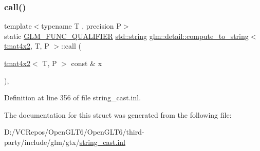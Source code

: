 \subsubsection{\texorpdfstring{call()}{call()}}
{\footnotesize\ttfamily template$<$typename T , precision P$>$ \\
static \mbox{\hyperlink{setup_8hpp_a33fdea6f91c5f834105f7415e2a64407}{G\+L\+M\+\_\+\+F\+U\+N\+C\+\_\+\+Q\+U\+A\+L\+I\+F\+I\+ER}} \mbox{\hyperlink{glad_8h_ac83513893df92266f79a515488701770}{std\+::string}} \mbox{\hyperlink{structglm_1_1detail_1_1compute__to__string}{glm\+::detail\+::compute\+\_\+to\+\_\+string}}$<$ \mbox{\hyperlink{structglm_1_1tmat4x2}{tmat4x2}}, T, P $>$\+::call (\begin{DoxyParamCaption}\item[{\mbox{\hyperlink{structglm_1_1tmat4x2}{tmat4x2}}$<$ T, P $>$ const \&}]{x }\end{DoxyParamCaption})\hspace{0.3cm}{\ttfamily [inline]}, {\ttfamily [static]}}



Definition at line 356 of file string\+\_\+cast.\+inl.



The documentation for this struct was generated from the following file\+:\begin{DoxyCompactItemize}
\item 
D\+:/\+V\+C\+Repos/\+Open\+G\+L\+T6/\+Open\+G\+L\+T6/third-\/party/include/glm/gtx/\mbox{\hyperlink{string__cast_8inl}{string\+\_\+cast.\+inl}}\end{DoxyCompactItemize}
